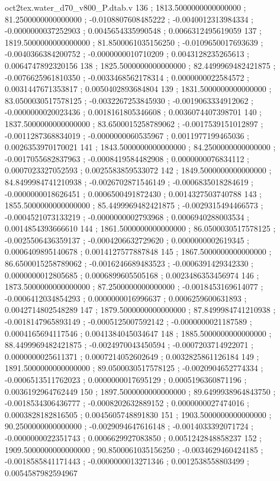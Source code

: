 \begin{filecontents}[overwrite]{oct2tex.water_d70_v800_P.dtab.v}
136 ; 1813.5000000000000000 ; 81.2500000000000000 ; -0.0108807608485222 ; -0.0040012313984334 ; -0.0000000037252903 ; 0.0045654335990548 ; 0.0066312495619059
137 ; 1819.5000000000000000 ; 81.8500061035156250 ; -0.0109650017693639 ; -0.0040366384200752 ; -0.0000000010710209 ; 0.0043128235265613 ; 0.0064747892320156
138 ; 1825.5000000000000000 ; 82.4499969482421875 ; -0.0076625961810350 ; -0.0033468562178314 ; 0.0000000022584572 ; 0.0031447671353817 ; 0.0050402893684804
139 ; 1831.5000000000000000 ; 83.0500030517578125 ; -0.0032267253845930 ; -0.0019063334912062 ; -0.0000000020023436 ; 0.0018161805346608 ; 0.0036074407398701
140 ; 1837.5000000000000000 ; 83.6500015258789062 ; -0.0017539151012897 ; -0.0011287368834019 ; -0.0000000060535967 ; 0.0011977199465036 ; 0.0026353970170021
141 ; 1843.5000000000000000 ; 84.2500000000000000 ; -0.0017055682837963 ; -0.0008419584482908 ; 0.0000000076834112 ; 0.0007023327052593 ; 0.0025583859533072
142 ; 1849.5000000000000000 ; 84.8499984741210938 ; -0.0026702871546149 ; -0.0006835018284619 ; -0.0000000018626451 ; 0.0006500491872430 ; 0.0014327503740788
143 ; 1855.5000000000000000 ; 85.4499969482421875 ; -0.0029315494466573 ; -0.0004521073133219 ; -0.0000000002793968 ; 0.0006940288003534 ; 0.0014854393666610
144 ; 1861.5000000000000000 ; 86.0500030517578125 ; -0.0025506436359137 ; -0.0004206632729620 ; 0.0000000002619345 ; 0.0006409895140678 ; 0.0014127577887848
145 ; 1867.5000000000000000 ; 86.6500015258789062 ; -0.0016246689483523 ; -0.0006391429342330 ; 0.0000000012805685 ; 0.0006899605505168 ; 0.0023486353456974
146 ; 1873.5000000000000000 ; 87.2500000000000000 ; -0.0018453169614077 ; -0.0006412034854293 ; 0.0000000016996637 ; 0.0006259600631893 ; 0.0042714802548289
147 ; 1879.5000000000000000 ; 87.8499984741210938 ; -0.0018147965893149 ; -0.0005125007592142 ; -0.0000000021187589 ; 0.0004165694117546 ; 0.0041384045034647
148 ; 1885.5000000000000000 ; 88.4499969482421875 ; -0.0024970043450594 ; -0.0007203714922071 ; 0.0000000025611371 ; 0.0007214052602649 ; 0.0032825861126184
149 ; 1891.5000000000000000 ; 89.0500030517578125 ; -0.0020904652774334 ; -0.0006513511762023 ; 0.0000000017695129 ; 0.0005196360871196 ; 0.0036192964762449
150 ; 1897.5000000000000000 ; 89.6499938964843750 ; -0.0018534306436777 ; -0.0008202632889152 ; 0.0000000027474016 ; 0.0003828182816505 ; 0.0045605748891830
151 ; 1903.5000000000000000 ; 90.2500000000000000 ; -0.0029094647616148 ; -0.0014033392071724 ; -0.0000000022351743 ; 0.0006629927083850 ; 0.0051242848858237
152 ; 1909.5000000000000000 ; 90.8500061035156250 ; -0.0034629460424185 ; -0.0018585841171443 ; -0.0000000013271346 ; 0.0012538558803499 ; 0.0054587982594967

\end{filecontents}
